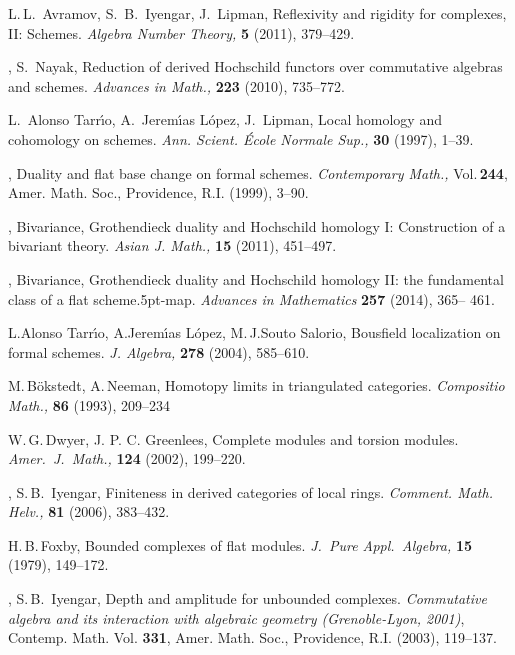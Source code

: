 \documentclass{compositio}
\theoremstyle{plain}
\theoremstyle{definition}
\theoremstyle{remark}
\numberwithin{equation}{thm}
\begin{document}
\begin{thebibliography}{AILN10}

 L.\,L.\ Avramov, S.\, B.\ Iyengar, J.\ Lipman,  Reflexivity and rigidity for complexes, 
   II: Schemes. {\it Algebra  Number Theory,} {\bf5} (2011), 379--429. 

 \bysame, S.\ Nayak, Reduction of derived Hochschild functors over commutative algebras and schemes. {\it Advances in Math.,} {\bf 223} (2010), 735--772.

 L.\ Alonso Tarr{\'{\i}}o, A.\ Jerem{\'{\i}}as
L{\'o}pez, J.\ Lipman,  Local homology and cohomology on schemes.
{\it Ann. Scient. \'Ecole Normale Sup.,} {\bf 30} (1997), 1--39.

 \bysame,  Duality and flat base change on
formal schemes.
{\it Contemporary Math.,} Vol.\,{\bf 244}, Amer. Math. Soc.,
Providence, R.I. (1999), 3--90.

 \bysame, Bivariance, Grothendieck duality and Hochschild homology I: Construction of a bivariant theory. {\it Asian J. Math.,} {\bf 15} (2011), 451--497.

 \bysame, Bivariance, Grothendieck duality and Hochschild homology II: the fundamental class of a flat scheme{\kern.5pt}-map. {\it Advances in Mathematics} {\bf 257} (2014), 365-- 461. 

 L.\:Alonso Tarr{\'{\i}}o, A.\:Jerem{\'{\i}}as L{\'o}pez,
M.\,J.\:Souto Salorio, Bousfield localization on formal schemes.
{\it J. Algebra,}  {\bf 278}  (2004),  585--610.

M.\,B\"okstedt, A.\,Neeman, Homotopy limits in triangulated categories.
\textit{Compositio Math.,}
{\bf 86} (1993),  209--234

 W.\,G.\,Dwyer, J. P. C. Greenlees, 
Complete modules and torsion modules. 
\textit{Amer.\ J.\ Math.,} {\bf 124} (2002), 199--220.

\bysame, S.\,B.\ Iyengar, Finiteness in derived categories of local rings. \textit{Comment. Math. Helv.,} {\bf 81} (2006), 383--432.

H.\,B.\,Foxby, Bounded complexes of flat modules.
\textit {J.\ Pure Appl.\ Algebra,}
{\bf 15} (1979),  149--172.

\bysame, S.\,B.\ Iyengar, Depth and amplitude for unbounded complexes. \textit{Commutative algebra and its interaction with algebraic geometry (Grenoble-Lyon, 2001)}, Contemp. Math. Vol. {\bf 331}, Amer. Math. Soc., Providence, R.I. (2003), 119--137.


\end{thebibliography}
\end{document}
